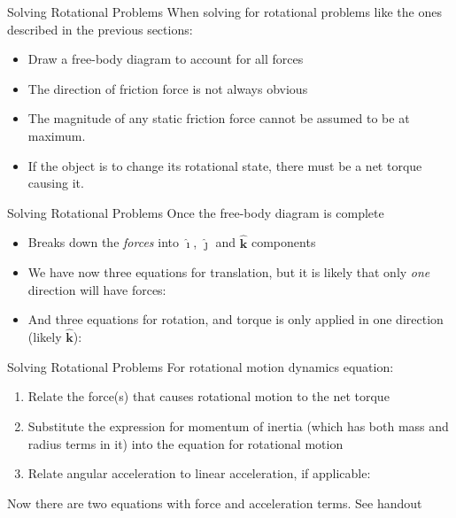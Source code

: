 \documentclass[12pt,compress,aspectratio=169]{beamer}
\newcommand{\iii}{\hat{\bm\imath}}
\newcommand{\jjj}{\hat{\bm\jmath}}
\newcommand{\kkk}{\hat{\bm{k}}}
\begin{document}
\begin{frame}{Solving Rotational Problems}
  When solving for rotational problems like the ones described in the previous
  sections:
  \begin{itemize}
  \item Draw a free-body diagram to account for all forces
  \item The direction of friction force is not always obvious
  \item The magnitude of any static friction force cannot be assumed to be at
    maximum.
  \item If the object is to change its rotational state, there must be a net
    torque causing it.
  \end{itemize}
\end{frame}



\begin{frame}{Solving Rotational Problems}
  Once the free-body diagram is complete
  \begin{itemize}
  \item Breaks down the \emph{forces} into $\iii$, $\jjj$ and $\kkk$ components
  \item We have now three equations for translation, but it is likely that only
    \emph{one} direction will have forces:

  \item And three equations for rotation, and torque is only applied in one
    direction (likely $\kkk$):
    
  \end{itemize}
\end{frame}



\begin{frame}{Solving Rotational Problems}
  For rotational motion dynamics equation:
  \begin{enumerate}
  \item Relate the force(s) that causes rotational motion to the net torque

  \item Substitute the expression for momentum of inertia (which has both mass
    and radius terms in it) into the equation for rotational motion
  \item Relate angular acceleration to linear acceleration, if applicable:

  \end{enumerate}
  Now there are two equations with force and acceleration terms. See handout
\end{frame}
\end{document}
